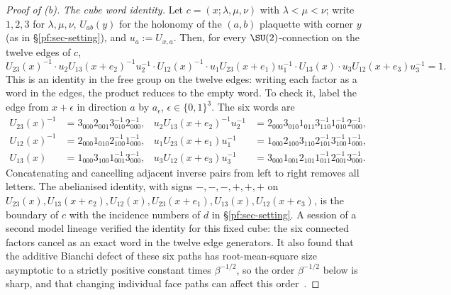 \begin{proof}[Proof of (b)]
\emph{The cube word identity.} Let $c=(x;\lambda,\mu,\nu)$ with $\lambda<\mu<\nu$; write $1,2,3$ for $\lambda,\mu,\nu$, $U_{ab}(y)$ for the holonomy of the $(a,b)$ plaquette with corner $y$ (as in \S\ref{pf:sec-setting}), and $u_a:=U_{x,a}$. Then, for every $\SU(2)$-connection on the twelve edges of $c$,
\begin{equation}\label{pf:eq-cube}
U_{23}(x)^{-1}\cdot u_2U_{13}(x+e_2)^{-1}u_2^{-1}\cdot U_{12}(x)^{-1}\cdot u_1U_{23}(x+e_1)u_1^{-1}\cdot U_{13}(x)\cdot u_3U_{12}(x+e_3)u_3^{-1}=1 .
\end{equation}
This is an identity in the free group on the twelve edges: writing each factor as a word in the edges, the product reduces to the empty word. To check it, label the edge from $x+\epsilon$ in direction $a$ by $a_\epsilon$, $\epsilon\in\{0,1\}^3$. The six words are
\begin{align*}
U_{23}(x)^{-1}&=3_{000}2_{001}3_{010}^{-1}2_{000}^{-1}, &
u_2U_{13}(x+e_2)^{-1}u_2^{-1}&=2_{000}3_{010}1_{011}3_{110}^{-1}1_{010}^{-1}2_{000}^{-1},\\
U_{12}(x)^{-1}&=2_{000}1_{010}2_{100}^{-1}1_{000}^{-1}, &
u_1U_{23}(x+e_1)u_1^{-1}&=1_{000}2_{100}3_{110}2_{101}^{-1}3_{100}^{-1}1_{000}^{-1},\\
U_{13}(x)&=1_{000}3_{100}1_{001}^{-1}3_{000}^{-1}, &
u_3U_{12}(x+e_3)u_3^{-1}&=3_{000}1_{001}2_{101}1_{011}^{-1}2_{001}^{-1}3_{000}^{-1}.
\end{align*}
Concatenating and cancelling adjacent inverse pairs from left to right removes all letters. The abelianised identity, with signs $-,-,-,+,+,+$ on $U_{23}(x),U_{13}(x+e_2),U_{12}(x),U_{23}(x+e_1),U_{13}(x),U_{12}(x+e_3)$, is the boundary of $c$ with the incidence numbers of $d$ in \S\ref{pf:sec-setting}. A session of a second model lineage verified the identity for this fixed cube: the six connected factors cancel as an exact word in the twelve edge generators. It also found that the additive Bianchi defect of these six paths has root-mean-square size asymptotic to a strictly positive constant times $\beta^{-1/2}$, so the order $\beta^{-1/2}$ below is sharp, and that changing individual face paths can affect this order~\cite[comment 7104976877]{RepoThread}.


\end{proof}
